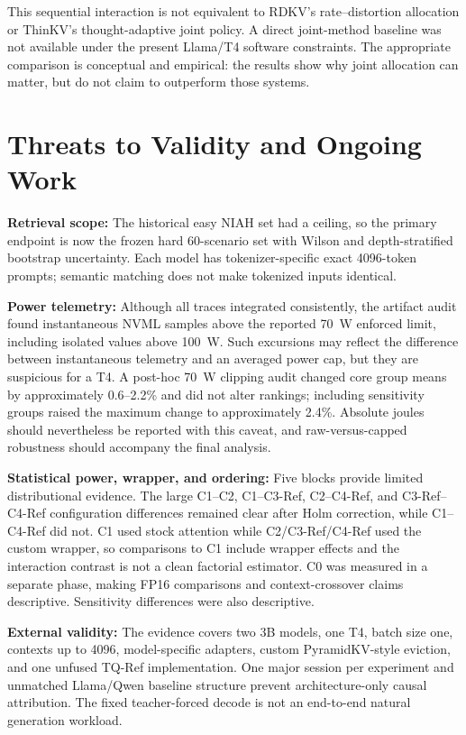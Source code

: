 \documentclass[conference]{IEEEtran}
\begin{document}
This sequential interaction is not equivalent to RDKV's rate--distortion allocation or ThinKV's thought-adaptive joint policy. A direct joint-method baseline was not available under the present Llama/T4 software constraints. The appropriate comparison is conceptual and empirical: the results show why joint allocation can matter, but do not claim to outperform those systems.


\section{Threats to Validity and Ongoing Work}

\textbf{Retrieval scope:} The historical easy NIAH set had a ceiling, so the primary endpoint is now the frozen hard 60-scenario set with Wilson and depth-stratified bootstrap uncertainty. Each model has tokenizer-specific exact 4096-token prompts; semantic matching does not make tokenized inputs identical.

\textbf{Power telemetry:} Although all traces integrated consistently, the artifact audit found instantaneous NVML samples above the reported 70~W enforced limit, including isolated values above 100~W. Such excursions may reflect the difference between instantaneous telemetry and an averaged power cap, but they are suspicious for a T4. A post-hoc 70~W clipping audit changed core group means by approximately 0.6--2.2\% and did not alter rankings; including sensitivity groups raised the maximum change to approximately 2.4\%. Absolute joules should nevertheless be reported with this caveat, and raw-versus-capped robustness should accompany the final analysis.

\textbf{Statistical power, wrapper, and ordering:} Five blocks provide limited distributional evidence. The large C1--C2, C1--C3-Ref, C2--C4-Ref, and C3-Ref--C4-Ref configuration differences remained clear after Holm correction, while C1--C4-Ref did not. C1 used stock attention while C2/C3-Ref/C4-Ref used the custom wrapper, so comparisons to C1 include wrapper effects and the interaction contrast is not a clean factorial estimator. C0 was measured in a separate phase, making FP16 comparisons and context-crossover claims descriptive. Sensitivity differences were also descriptive.

\textbf{External validity:} The evidence covers two 3B models, one T4, batch size one, contexts up to 4096, model-specific adapters, custom PyramidKV-style eviction, and one unfused TQ-Ref implementation. One major session per experiment and unmatched Llama/Qwen baseline structure prevent architecture-only causal attribution. The fixed teacher-forced decode is not an end-to-end natural generation workload.
\end{document}
